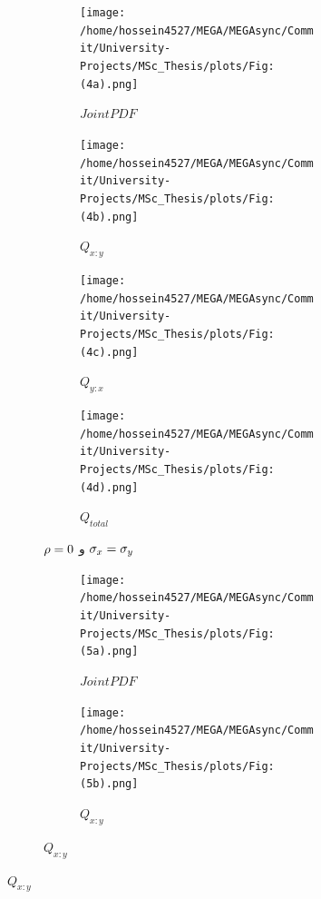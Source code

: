 \documentclass[a4paper,titlepage,12pt,fleqn,oneside]{report}
\begin{document}
  \begin{figure}[tbp]
  	\centering
  	\begin{subfigure}[b]{\textwidth}
  		\renewcommand\thesubfigure{a}
  		\begin{subfigure}[b]{0.24\textwidth}
  			\renewcommand\thesubfigure{i}
  			\centering
  			\texttt{[image: /home/hossein4527/MEGA/MEGAsync/Commit/University-Projects/MSc\_Thesis/plots/Fig:(4a).png]}
  			\caption{$Joint PDF$}
  			\label{fig:2.1.1}
  		\end{subfigure}
  		\hfill
  		\begin{subfigure}[b]{0.24\textwidth}
  			\renewcommand\thesubfigure{ii}
  			\centering
  			\texttt{[image: /home/hossein4527/MEGA/MEGAsync/Commit/University-Projects/MSc\_Thesis/plots/Fig:(4b).png]}
  			\caption{$Q_{x:y}$}
  			\label{fig:2.1.2}
  		\end{subfigure}
  		\hfill
  		\begin{subfigure}[b]{0.24\textwidth}
  			\renewcommand\thesubfigure{iii}
  			\centering
  			\texttt{[image: /home/hossein4527/MEGA/MEGAsync/Commit/University-Projects/MSc\_Thesis/plots/Fig:(4c).png]}
  			\caption{$Q_{y:x}$}
  			\label{fig:2.1.3}
  		\end{subfigure}
  		\hfill
  		\begin{subfigure}[b]{0.24\textwidth}
  			\renewcommand\thesubfigure{iv}
  			\centering
  			\texttt{[image: /home/hossein4527/MEGA/MEGAsync/Commit/University-Projects/MSc\_Thesis/plots/Fig:(4d).png]}
  			\caption{$Q_{total}$}
  			\label{fig:2.1.4}
  		\end{subfigure}
  		\caption{$\protect\rho =0$ و $\protect\sigma _{x}=\protect\sigma _{y}$}
  		\label{fig:2.1}
  	\end{subfigure}
  	\begin{subfigure}[b]{\textwidth}
  		\renewcommand\thesubfigure{b}
  		\begin{subfigure}[b]{0.24\textwidth}
  			\renewcommand\thesubfigure{i}
  			\centering
  			\texttt{[image: /home/hossein4527/MEGA/MEGAsync/Commit/University-Projects/MSc\_Thesis/plots/Fig:(5a).png]}
  			\caption{$Joint PDF$}
  			\label{fig:2.2.1}
  		\end{subfigure}
  		\hfill
  		\begin{subfigure}[b]{0.24\textwidth}
  			\renewcommand\thesubfigure{ii}
  			\centering
  			\texttt{[image: /home/hossein4527/MEGA/MEGAsync/Commit/University-Projects/MSc\_Thesis/plots/Fig:(5b).png]}
  			\caption{$Q_{x:y}$}
  			\label{fig:2.2.2}
  		\end{subfigure}

\end{subfigure}
\end{figure}
\end{document}
